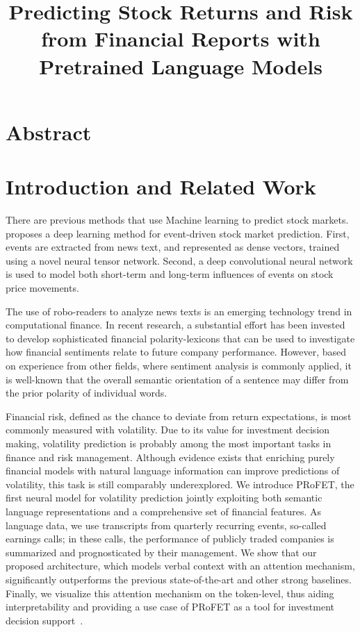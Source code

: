 \documentclass[11pt]{article}
\title{\vspace{-4cm} Predicting Stock Returns and Risk from Financial Reports with Pretrained Language Models}
\author{}
\date{}
\begin{document}
\maketitle

\section{Abstract}

\section{Introduction and Related Work}

There are previous methods that use Machine learning to predict stock
markets.~\cite{ding2015} proposes a deep learning method for
event-driven stock market prediction. First, events are extracted from news text, and represented as dense vectors,
trained using a novel neural tensor network. Second, a deep convolutional neural network is used to model both short-term and
long-term influences of events on stock price movements.

The use of robo-readers to analyze news texts is an emerging technology trend in computational finance. In recent
research, a substantial effort has been invested to develop sophisticated financial polarity-lexicons that can be used to
investigate how financial sentiments relate to future company performance. However, based on experience from other
fields, where sentiment analysis is commonly applied, it is well-known
that the overall semantic orientation of a sentence may differ from
the prior polarity of individual words.

Financial risk, defined as the chance to deviate from return expectations, is most commonly measured
with volatility. Due to its value for investment decision making, volatility prediction is probably
among the most important tasks in finance and risk management. Although evidence exists that enriching purely financial models with natural language
information can improve predictions of volatility, this task is still comparably underexplored. We introduce PRoFET, the
first neural model for volatility prediction jointly exploiting both
semantic language representations and a comprehensive set of financial
features. As language data, we use transcripts from quarterly
recurring events, so-called earnings calls; in these calls, the performance of publicly traded companies is summarized and prognosticated by their management. We show that our
proposed architecture, which models verbal context with an attention mechanism, significantly outperforms the previous state-of-the-art and other strong
baselines. Finally, we visualize this attention mechanism on the token-level, thus aiding interpretability and providing a use case of PRoFET as a tool
for investment decision support~\cite{theil2019}.
\end{document}

